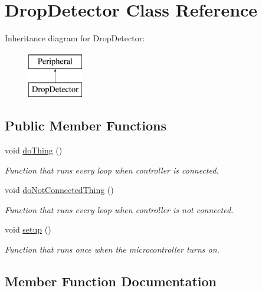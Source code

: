 \hypertarget{class_drop_detector}{}\section{Drop\+Detector Class Reference}
\label{class_drop_detector}
Inheritance diagram for Drop\+Detector\+:\begin{figure}[H]
\begin{center}
\leavevmode
\includegraphics[height=2.000000cm]{class_drop_detector}
\end{center}
\end{figure}
\subsection*{Public Member Functions}
\begin{DoxyCompactItemize}
\item 
void \mbox{\hyperlink{class_drop_detector_afb6516b60179f581efb76781a6a6f8f2}{do\+Thing}} ()
\begin{DoxyCompactList}\small\item\em Function that runs every loop when controller is connected. \end{DoxyCompactList}\item 
void \mbox{\hyperlink{class_drop_detector_a5d691370f57a4b0d8c0ea6367fbc574d}{do\+Not\+Connected\+Thing}} ()
\begin{DoxyCompactList}\small\item\em Function that runs every loop when controller is not connected. \end{DoxyCompactList}\item 
void \mbox{\hyperlink{class_drop_detector_a067472af2a6852f694d61a6a53b9843e}{setup}} ()
\begin{DoxyCompactList}\small\item\em Function that runs once when the microcontroller turns on. \end{DoxyCompactList}\end{DoxyCompactItemize}


\subsection{Member Function Documentation}
\mbox{\label{class_drop_detector_a5d691370f57a4b0d8c0ea6367fbc574d}} 
